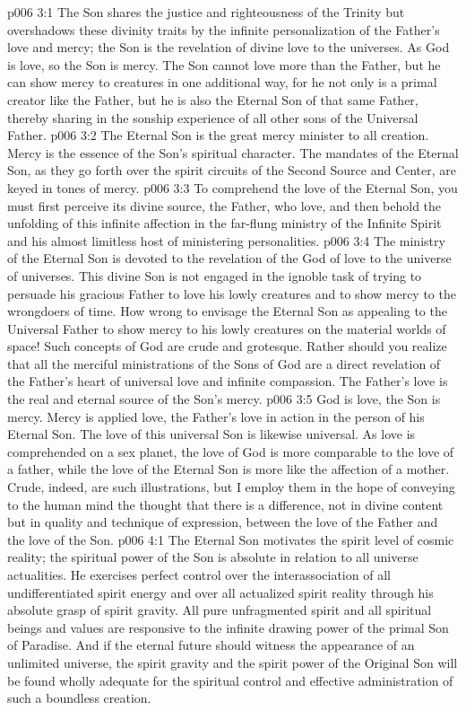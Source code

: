 \vs p006 3:1 The Son shares the justice and righteousness of the Trinity but overshadows these divinity traits by the infinite personalization of the Father’s love and mercy; the Son is the revelation of divine love to the universes. As God is love, so the Son is mercy. The Son cannot love more than the Father, but he can show mercy to creatures in one additional way, for he not only is a primal creator like the Father, but he is also the Eternal Son of that same Father, thereby sharing in the sonship experience of all other sons of the Universal Father.
\vs p006 3:2 The Eternal Son is the great mercy minister to all creation. Mercy is the essence of the Son’s spiritual character. The mandates of the Eternal Son, as they go forth over the spirit circuits of the Second Source and Center, are keyed in tones of mercy.\plusone
\vs p006 3:3 To comprehend the love of the Eternal Son, you must first perceive its divine source, the Father, who  love, and then behold the unfolding of this infinite affection in the far\hyp{}flung ministry of the Infinite Spirit and his almost limitless host of ministering personalities.
\vs p006 3:4 The ministry of the Eternal Son is devoted to the revelation of the God of love to the universe of universes. This divine Son is not engaged in the ignoble task of trying to persuade his gracious Father to love his lowly creatures and to show mercy to the wrongdoers of time. How wrong to envisage the Eternal Son as appealing to the Universal Father to show mercy to his lowly creatures on the material worlds of space! Such concepts of God are crude and grotesque. Rather should you realize that all the merciful ministrations of the Sons of God are a direct revelation of the Father’s heart of universal love and infinite compassion. The Father’s love is the real and eternal source of the Son’s mercy.
\vs p006 3:5 God is love, the Son is mercy. Mercy is applied love, the Father’s love in action in the person of his Eternal Son. The love of this universal Son is likewise universal. As love is comprehended on a sex planet, the love of God is more comparable to the love of a father, while the love of the Eternal Son is more like the affection of a mother. Crude, indeed, are such illustrations, but I employ them in the hope of conveying to the human mind the thought that there is a difference, not in divine content but in quality and technique of expression, between the love of the Father and the love of the Son.
\vs p006 4:1 The Eternal Son motivates the spirit level of cosmic reality; the spiritual power of the Son is absolute in relation to all universe actualities. He exercises perfect control over the interassociation of all undifferentiated spirit energy and over all actualized spirit reality through his absolute grasp of spirit gravity. All pure unfragmented spirit and all spiritual beings and values are responsive to the infinite drawing power of the primal Son of Paradise. And if the eternal future should witness the appearance of an unlimited universe, the spirit gravity and the spirit power of the Original Son will be found wholly adequate for the spiritual control and effective administration of such a boundless creation.

